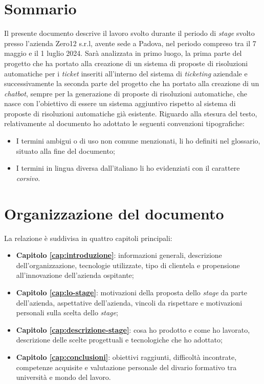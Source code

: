 \cleardoublepage
{}
{}
\begingroup
\let\clearpage\relax
\let\cleardoublepage\relax
\let\cleardoublepage\relax

\chapter*{Sommario}

Il presente documento descrive il lavoro svolto durante il periodo di \textit{stage} svolto presso l'azienda Zero12 s.r.l, avente sede a Padova, nel periodo compreso tra il 7 maggio e il 1 luglio 2024.
Sarà analizzata in primo luogo, la prima parte del progetto che ha portato alla creazione di un sistema di proposte di risoluzioni automatiche per i \textit{ticket} inseriti all'interno del sistema di \textit{ticketing} aziendale e successivamente
la seconda parte del progetto che ha portato alla creazione di un \textit{chatbot}, sempre per la generazione di proposte di risoluzioni automatiche, che nasce con l'obiettivo di essere un sistema aggiuntivo rispetto al sistema di proposte di risoluzioni automatiche già esistente.
Riguardo alla stesura del testo, relativamente al documento ho adottato le seguenti convenzioni tipografiche:
\begin{itemize}
    \item I termini ambigui o di uso non comune menzionati, li ho definiti nel glossario, situato alla fine del documento;
    \item I termini in lingua diversa dall'italiano li ho evidenziati con il carattere \emph{corsivo}.
\end{itemize}

{}
\chapter*{Organizzazione del documento}
La relazione è suddivisa in quattro capitoli principali:
\begin{itemize}
    \item \textbf{Capitolo \ref{cap:introduzione}}: informazioni generali, descrizione dell'organizzazione, tecnologie utilizzate, tipo di clientela e propensione all'innovazione dell'azienda ospitante;
    \item \textbf{Capitolo \ref{cap:lo-stage}}: motivazioni della proposta dello \textit{stage} da parte dell'azienda, aspettative dell'azienda, vincoli da rispettare e motivazioni personali sulla scelta dello \textit{stage};
    \item \textbf{Capitolo \ref{cap:descrizione-stage}}: cosa ho prodotto e come ho lavorato, descrizione delle scelte progettuali e tecnologiche che ho adottato;
    \item \textbf{Capitolo \ref{cap:conclusioni}}: obiettivi raggiunti, difficoltà incontrate, competenze acquisite e valutazione personale del divario formativo tra università e mondo del lavoro.
\end{itemize}




\endgroup

\vfill

